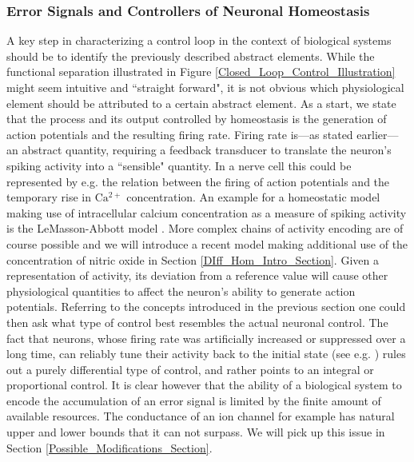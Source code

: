 \documentclass[10pt,a4paper]{article}
\begin{document}
\subsubsection{Error Signals and Controllers of Neuronal Homeostasis}
A key step in characterizing a control loop in the context of biological systems should be to identify the previously described abstract elements. While the functional separation illustrated in Figure \ref{Closed_Loop_Control_Illustration} might seem intuitive and ``straight forward", it is not obvious which physiological element should be attributed to a certain abstract element.
As a start, we state that the process and its output controlled by homeostasis is the generation of action potentials and the resulting firing rate. Firing rate is---as stated earlier---an abstract quantity, requiring a feedback transducer to translate the neuron's spiking activity into a ``sensible" quantity. In a nerve cell this could be represented by e.g. the relation between the firing of action potentials and the temporary rise in $\mathrm{Ca^{2+}}$ concentration. An example for a homeostatic model making use of intracellular calcium concentration as a measure of spiking activity is the LeMasson-Abbott model \cite{LeMasson_1993}. More complex chains of activity encoding are of course possible and we will introduce a recent model making additional use of the concentration of nitric oxide in Section \ref{DIff_Hom_Intro_Section}. Given a representation of activity, its deviation from a reference value will cause other physiological quantities to affect the neuron's ability to generate action potentials. Referring to the concepts introduced in the previous section one could then ask what type of control best resembles the actual neuronal control. The fact that neurons, whose firing rate was artificially increased or suppressed over a long time, can reliably tune their activity back to the initial state (see e.g. \cite{Burrone_2002}) rules out a purely differential type of control, and rather points to an integral or proportional control. It is clear however that the ability of a biological system to encode the accumulation of an error signal is limited by the finite amount of available resources. The conductance of an ion channel for example has natural upper and lower bounds that it can not surpass. We will pick up this issue in Section \ref{Possible_Modifications_Section}.
\end{document}
